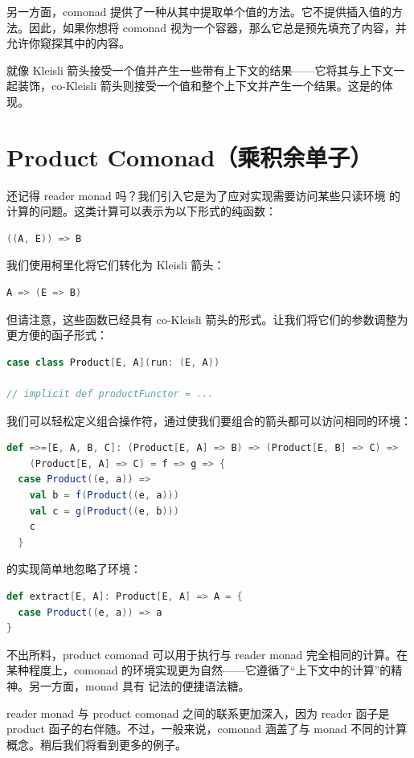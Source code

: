 另一方面，comonad 提供了一种从其中提取单个值的方法。它不提供插入值的方法。因此，如果你想将 comonad 视为一个容器，那么它总是预先填充了内容，并允许你窥探其中的内容。

就像 Kleisli 箭头接受一个值并产生一些带有上下文的结果——它将其与上下文一起装饰，co-Kleisli 箭头则接受一个值和整个上下文并产生一个结果。这是的体现。

\section{Product Comonad（乘积余单子）}

还记得 reader monad 吗？我们引入它是为了应对实现需要访问某些只读环境  的计算的问题。这类计算可以表示为以下形式的纯函数：

\begin{lstlisting}[language=Scala]
((A, E)) => B
\end{lstlisting}
我们使用柯里化将它们转化为 Kleisli 箭头：

\begin{lstlisting}[language=Scala]
A => (E => B)
\end{lstlisting}
但请注意，这些函数已经具有 co-Kleisli 箭头的形式。让我们将它们的参数调整为更方便的函子形式：

\begin{lstlisting}[language=Scala]
case class Product[E, A](run: (E, A))

// implicit def productFunctor = ...
\end{lstlisting}
我们可以轻松定义组合操作符，通过使我们要组合的箭头都可以访问相同的环境：

\begin{lstlisting}[language=Scala]
def =>=[E, A, B, C]: (Product[E, A] => B) => (Product[E, B] => C) =>
    (Product[E, A] => C) = f => g => {
  case Product((e, a)) =>
    val b = f(Product((e, a)))
    val c = g(Product((e, b)))
    c
  }

\end{lstlisting}
 的实现简单地忽略了环境：

\begin{lstlisting}[language=Scala]
def extract[E, A]: Product[E, A] => A = {
  case Product((e, a)) => a
}
\end{lstlisting}
不出所料，product comonad 可以用于执行与 reader monad 完全相同的计算。在某种程度上，comonad 的环境实现更为自然——它遵循了“上下文中的计算”的精神。另一方面，monad 具有  记法的便捷语法糖。

reader monad 与 product comonad 之间的联系更加深入，因为 reader 函子是 product 函子的右伴随。不过，一般来说，comonad 涵盖了与 monad 不同的计算概念。稍后我们将看到更多的例子。

